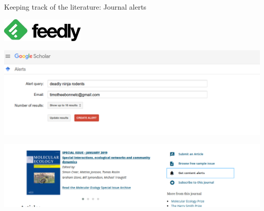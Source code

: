 \documentclass[10pt]{beamer}%
\begin{document}
\begin{frame}{Keeping track of the literature: Journal alerts}

    \includegraphics[width=0.3\textwidth]{Figures/feedly}
    
    \includegraphics[width=\textwidth]{Figures/gooalert}
    
    \includegraphics[width=\textwidth]{Figures/molecol}
    
\end{frame}
\end{document}
